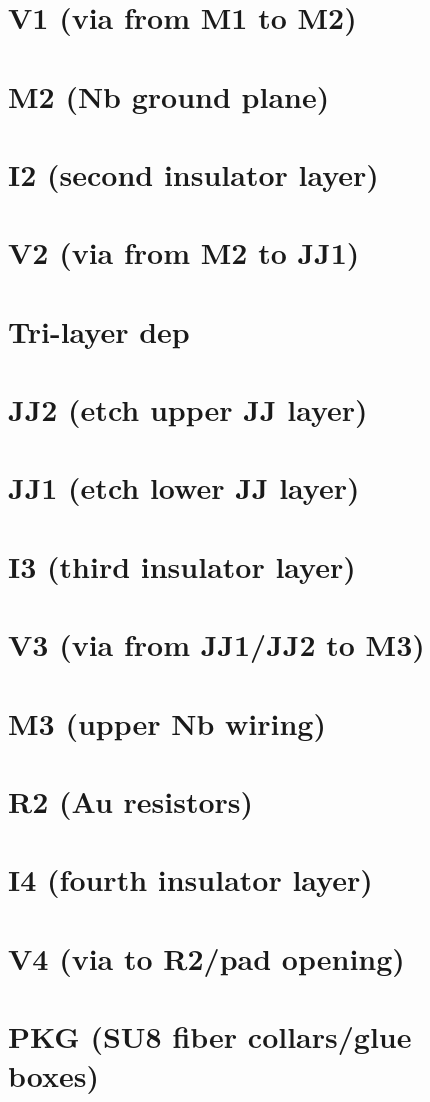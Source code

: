 \documentclass[]{article}
\begin{document}
\section{\label{sec:v1}V1 (via from M1 to M2)}


\section{\label{sec:m2}M2 (Nb ground plane)}


\section{\label{sec:i2}I2 (second insulator layer)}


\section{\label{sec:v2}V2 (via from M2 to JJ1)}


\section{\label{sec:tri}Tri-layer dep}


\section{\label{sec:jj2}JJ2 (etch upper JJ layer)}


\section{\label{sec:jj1}JJ1 (etch lower JJ layer)}


\section{\label{sec:i3}I3 (third insulator layer)}


\section{\label{sec:v3}V3 (via from JJ1/JJ2 to M3)}


\section{\label{sec:m3}M3 (upper Nb wiring)}


\section{\label{sec:r2}R2 (Au resistors)}


\section{\label{sec:i4}I4 (fourth insulator layer)}


\section{\label{sec:v4}V4 (via to R2/pad opening)}


\section{\label{sec:pkg}PKG (SU8 fiber collars/glue boxes)}

\end{document}
